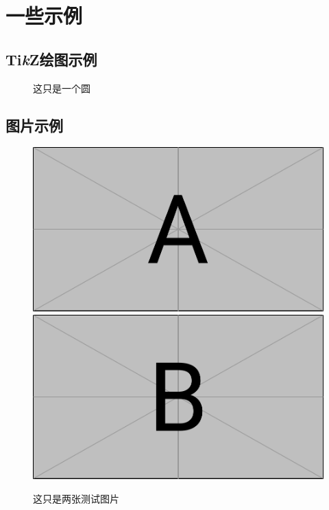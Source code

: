 \section{一些示例}
\subsection{Ti\textit{k}Z绘图示例}
\begin{figure}[htbp!]
    \centering
    \caption{这只是一个圆}
\end{figure}

\subsection{图片示例}
\begin{figure}[htbp!]
    \centering
    \includegraphics[scale = 0.35]{res/TestFigureA.pdf}
    \quad
    \includegraphics[scale = 0.35]{res/TestFigureB.pdf}
    \caption{这只是两张测试图片}
\end{figure}

